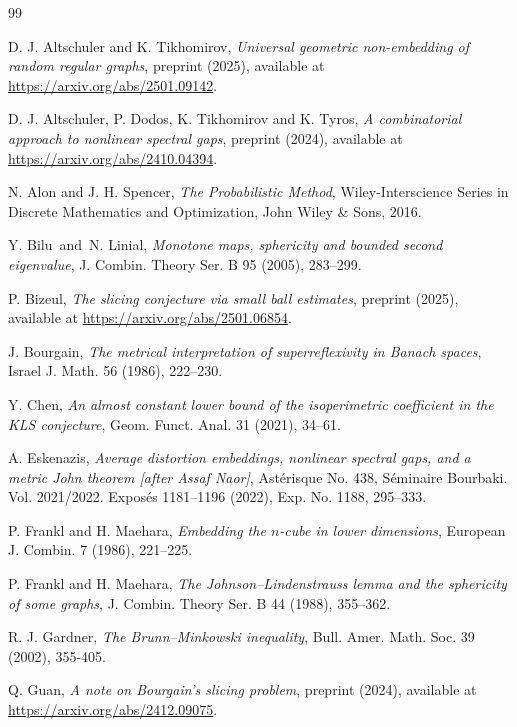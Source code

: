 \documentclass[11pt,leqno]{amsart}
\theoremstyle{remark}
\theoremstyle{plain}
\begin{document}
\begin{thebibliography}{99}

D. J. Altschuler and K. Tikhomirov,
\emph{Universal geometric non-embedding of random regular graphs},
preprint (2025), available at \url{https://arxiv.org/abs/2501.09142}.

D. J. Altschuler, P. Dodos, K. Tikhomirov and K. Tyros,
\emph{A combinatorial approach to nonlinear spectral gaps},
preprint (2024), available at \url{https://arxiv.org/abs/2410.04394}.

N. Alon and J. H. Spencer,
\emph{The Probabilistic Method},
Wiley-Interscience Series in Discrete Mathematics and Optimization, John Wiley \& Sons, 2016.

Y. Bilu\ and\ N. Linial,
\emph{Monotone maps, sphericity and bounded second eigenvalue},
J. Combin. Theory Ser. B 95 (2005), 283--299.

P. Bizeul,
\emph{The slicing conjecture via small ball estimates},
preprint (2025), available at \url{https://arxiv.org/abs/2501.06854}.

J. Bourgain,
\emph{The metrical interpretation of superreflexivity in Banach spaces},
Israel J. Math. 56 (1986), 222--230.

Y. Chen,
\emph{An almost constant lower bound of the isoperimetric coefficient in the KLS conjecture},
Geom. Funct. Anal. 31 (2021), 34--61.

A. Eskenazis,
\emph{Average distortion embeddings, nonlinear spectral gaps, and a metric John theorem [{\it after} Assaf Naor]},
Ast\'{e}risque No. 438, S\'{e}minaire Bourbaki. Vol. 2021/2022. Expos\'{e}s 1181--1196 (2022), Exp. No. 1188, 295--333.

P. Frankl and H. Maehara,
\emph{Embedding the $n$-cube in lower dimensions},
European J. Combin. 7 (1986), 221--225.

P. Frankl and H. Maehara,
\emph{The Johnson--Lindenstrauss lemma and the sphericity of some graphs},
J. Combin. Theory Ser. B 44 (1988), 355--362.

R. J. Gardner,
\emph{The Brunn--Minkowski inequality},
Bull. Amer. Math. Soc. 39 (2002), 355-405.

Q. Guan,
\emph{A note on Bourgain's slicing problem},
preprint (2024), available at \url{https://arxiv.org/abs/2412.09075}.


\end{thebibliography}
\end{document}
